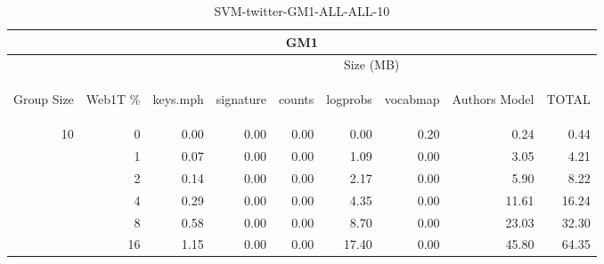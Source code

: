 \begin{center}
\begin{table}[htbp] 
 \begin{center}
\begin{tabular}{ | r | r | r | r | r | r | r | r | r |}
\hline
\multicolumn{9}{|c|}{GM1}\\
\hline
 & & \multicolumn{7}{|c|}{Size (MB)}\\ \cline{3-9}
\begin{sideways}Group Size\end{sideways} & \begin{sideways}Web1T \% \end{sideways} & \begin{sideways}keys.mph\end{sideways} & \begin{sideways}signature\end{sideways} & \begin{sideways}counts\end{sideways} & \begin{sideways}logprobs\end{sideways} & \begin{sideways}vocabmap\end{sideways} & \begin{sideways}Authors Model \end{sideways} & \begin{sideways}TOTAL\end{sideways}\\
\hline
\multirow{5}{*}{10}
 & 0 & 0.00 & 0.00 & 0.00 & 0.00 & 0.20 & 0.24 & 0.44\\ \cline{2-9}
 & 1 & 0.07 & 0.00 & 0.00 & 1.09 & 0.00 & 3.05 & 4.21\\ \cline{2-9}
 & 2 & 0.14 & 0.00 & 0.00 & 2.17 & 0.00 & 5.90 & 8.22\\ \cline{2-9}
 & 4 & 0.29 & 0.00 & 0.00 & 4.35 & 0.00 & 11.61 & 16.24\\ \cline{2-9}
 & 8 & 0.58 & 0.00 & 0.00 & 8.70 & 0.00 & 23.03 & 32.30\\ \cline{2-9}
 & 16 & 1.15 & 0.00 & 0.00 & 17.40 & 0.00 & 45.80 & 64.35\\ \cline{2-9}
\hline
\end{tabular}
\caption{SVM-twitter-GM1-ALL-ALL-10}
\label{table:SVM-twitter-GM1-ALL-ALL-10}
\end{center}
 \end{table}
\end{center}

